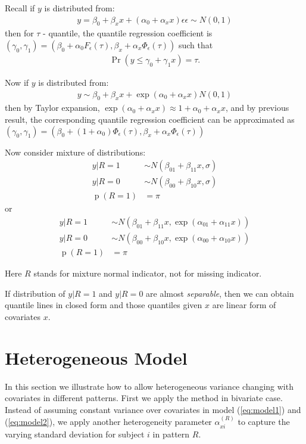 \documentclass[12pt]{article}
\DeclareMathOperator{\pr}{p}
\DeclareMathOperator{\prob}{Pr}
\begin{document}
Recall if $y$ is distributed from:
\begin{align*}
y =  \beta_0 + \beta_x x + (\alpha_0 + \alpha_xx) \epsilon
\epsilon \sim N(0, 1)
\end{align*}
then for $\tau$ - quantile, the quantile regression coefficient is $(\gamma_0, \gamma_1) 
= (\beta_0 + \alpha_0F_{\epsilon}(\tau), \beta_x + \alpha_x\Phi_{\epsilon}(\tau))$ such that
\begin{align*}
\prob (y \leq \gamma_0 + \gamma_1x) = \tau.
\end{align*}

Now if $y$ is distributed from:
\begin{align*}
y \sim \beta_0 + \beta_x x + \exp(\alpha_0 + \alpha_xx) N(0, 1)
\end{align*}
then by Taylor expansion, $\exp(\alpha_0 + \alpha_xx) \approx 1 + \alpha_0 + \alpha_xx$, and by previous result, the
corresponding quantile regression coefficient can be approximated as 
$(\gamma_0, \gamma_1) 
= (\beta_0 + (1 + \alpha_0)\Phi_{\epsilon}(\tau), \beta_x + \alpha_x\Phi_{\epsilon}(\tau))$ 

Now consider mixture of distributions:
\begin{align*}
  y | R = 1 & \sim N(\beta_{01} + \beta_{11}x,  \sigma)\\
  y | R = 0 & \sim N(\beta_{00} + \beta_{10}x, \sigma) \\
  \pr (R = 1) & = \pi
\end{align*}
or
\begin{align*}
  y | R = 1 & \sim N(\beta_{01} + \beta_{11}x,  \exp(\alpha_{01} + \alpha_{11}x))\\
  y | R = 0 & \sim N(\beta_{00} + \beta_{10}x, \exp(\alpha_{00}+ \alpha_{10}x)) \\
  \pr (R = 1) & = \pi
\end{align*}

Here $R$ stands for mixture normal indicator, not for missing
indicator.

If distribution of $y|R = 1$ and $y | R = 0$ are almost \textit{separable}, then we can obtain quantile lines in closed form and those quantiles given $x$ are linear form of covariates $x$.


\section{Heterogeneous Model}

In this section we illustrate how to allow heterogeneous variance
changing with covariates in different patterns.  First we apply the
method in bivariate case. Instead of assuming constant variance over
covariates in model (\ref{eq:model1}) and (\ref{eq:model2}), we apply
another heterogeneity parameter $\alpha_{xi}^{(R)}$ to capture the
varying standard deviation for subject $i$ in pattern $R$.
\end{document}
